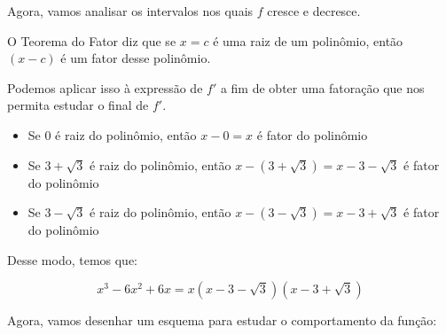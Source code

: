 \documentclass{article}
\begin{document}
Agora, vamos analisar os intervalos nos quais \(f\) cresce e decresce.

O Teorema do Fator diz que se \(x = c\) é uma raiz de um polinômio, então
\((x - c)\) é um fator desse polinômio.

Podemos aplicar isso à expressão de \(f'\) a fim de obter uma fatoração que
nos permita estudar o final de \(f'\).

\begin{itemize}
    \item Se 0 é raiz do polinômio, então \(x-0 = x\) é fator do polinômio
    \item Se \( 3 + \sqrt{3}\) é raiz do polinômio,
          então \(x-(3 + \sqrt{3}) = x - 3 - \sqrt{3}\) é fator do polinômio
    \item Se \( 3 - \sqrt{3}\) é raiz do polinômio,
          então \(x-(3 - \sqrt{3}) = x - 3 + \sqrt{3}\) é fator do polinômio
\end{itemize}

Desse modo, temos que:

\begin{equation}
    x^{3}-6x^2+ 6x = x(x - 3 - \sqrt{3})(x - 3 + \sqrt{3})
\end{equation}

Agora, vamos desenhar um esquema para estudar o comportamento da função:

\end{document}
